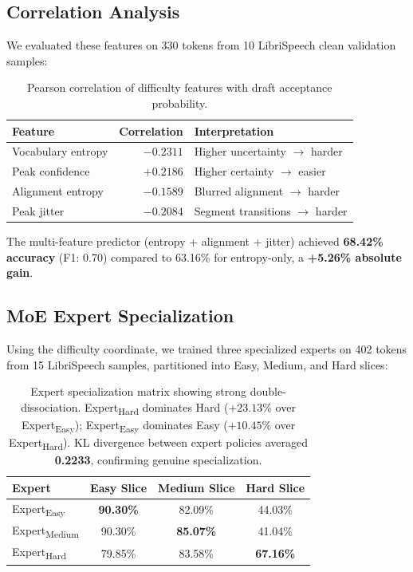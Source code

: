 \documentclass[11pt,a4paper]{article}
\begin{document}
\subsection{Correlation Analysis}

We evaluated these features on 330 tokens from 10 LibriSpeech clean validation samples:

\begin{table}[H]
\centering
\small
\begin{tabular}{@{}lrl@{}}
\toprule
\textbf{Feature} & \textbf{Correlation} & \textbf{Interpretation} \\
\midrule
Vocabulary entropy & $-0.2311$ & Higher uncertainty $\rightarrow$ harder \\
Peak confidence & $+0.2186$ & Higher certainty $\rightarrow$ easier \\
Alignment entropy & $-0.1589$ & Blurred alignment $\rightarrow$ harder \\
Peak jitter & $-0.2084$ & Segment transitions $\rightarrow$ harder \\
\bottomrule
\end{tabular}
\caption{Pearson correlation of difficulty features with draft acceptance probability.}
\label{tab:correlation}
\end{table}

The multi-feature predictor (entropy + alignment + jitter) achieved \textbf{68.42\% accuracy} (F1: 0.70) compared to 63.16\% for entropy-only, a \textbf{+5.26\% absolute gain}.

\subsection{MoE Expert Specialization}

Using the difficulty coordinate, we trained three specialized experts on 402 tokens from 15 LibriSpeech samples, partitioned into Easy, Medium, and Hard slices:

\begin{table}[H]
\centering
\small
\begin{tabular}{@{}lccc@{}}
\toprule
\textbf{Expert} & \textbf{Easy Slice} & \textbf{Medium Slice} & \textbf{Hard Slice} \\
\midrule
Expert\textsubscript{Easy}   & \textbf{90.30\%} & 82.09\% & 44.03\% \\
Expert\textsubscript{Medium} & 90.30\% & \textbf{85.07\%} & 41.04\% \\
Expert\textsubscript{Hard}   & 79.85\% & 83.58\% & \textbf{67.16\%} \\
\bottomrule
\end{tabular}
\caption{Expert specialization matrix showing strong double-dissociation.
Expert\textsubscript{Hard} dominates Hard ($+23.13\%$ over Expert\textsubscript{Easy}); Expert\textsubscript{Easy} dominates Easy ($+10.45\%$ over Expert\textsubscript{Hard}).
KL divergence between expert policies averaged \textbf{0.2233}, confirming genuine specialization.}
\label{tab:moe}
\end{table}
\end{document}
